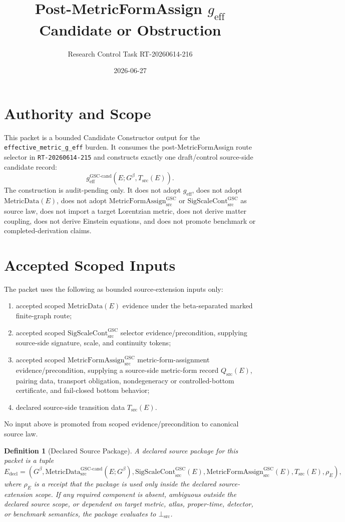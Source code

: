 \documentclass[11pt]{article}
\title{Post-MetricFormAssign \texorpdfstring{$g_{\mathrm{eff}}$}{g_eff} Candidate or Obstruction}
\author{Research Control Task RT-20260614-216}
\date{2026-06-27}
\newtheorem{definition}{Definition}
\newcommand{\Gbeta}{G^{\beta}}
\newcommand{\MetricDataCand}{\mathrm{MetricData}^{\mathrm{GSC\mbox{-}cand}}_{\mathrm{src}}}
\newcommand{\SigScaleCont}{\mathrm{SigScaleCont}^{\mathrm{GSC}}_{\mathrm{src}}}
\newcommand{\MetricFormAssign}{\mathrm{MetricFormAssign}^{\mathrm{GSC}}_{\mathrm{src}}}
\newcommand{\Qsrc}{Q_{\mathrm{src}}}
\newcommand{\Tsrc}{T_{\mathrm{src}}}
\newcommand{\BottomSrc}{\bot_{\mathrm{src}}}
\newcommand{\geff}{g_{\mathrm{eff}}}
\newcommand{\geffCand}{g_{\mathrm{eff}}^{\mathrm{GSC\mbox{-}cand}}}
\begin{document}
\maketitle

\section*{Authority and Scope}

This packet is a bounded Candidate Constructor output for the
\texttt{effective\_metric\_g\_eff} burden. It consumes the
post-MetricFormAssign route selector in
\texttt{RT-20260614-215} and constructs exactly one draft/control source-side
candidate record:
\[
  \geffCand(E;\Gbeta,\Tsrc(E)).
\]
The construction is audit-pending only. It does not adopt \(\geff\), does not
adopt \(\mathrm{MetricData}(E)\), does not adopt \(\MetricFormAssign\) or
\(\SigScaleCont\) as source law, does not import a target Lorentzian metric,
does not derive matter coupling, does not derive Einstein equations, and does
not promote benchmark or completed-derivation claims.

\section*{Accepted Scoped Inputs}

The packet uses the following as bounded source-extension inputs only:

\begin{enumerate}[label=\textbf{I\arabic*.}]
  \item accepted scoped \(\mathrm{MetricData}(E)\) evidence under the
  beta-separated marked finite-graph route;
  \item accepted scoped \(\SigScaleCont\) selector evidence/precondition,
  supplying source-side signature, scale, and continuity tokens;
  \item accepted scoped \(\MetricFormAssign\) metric-form-assignment
  evidence/precondition, supplying a source-side metric-form record
  \(\Qsrc(E)\), pairing data, transport obligation, nondegeneracy or
  controlled-bottom certificate, and fail-closed bottom behavior;
  \item declared source-side transition data \(\Tsrc(E)\).
\end{enumerate}

No input above is promoted from scoped evidence/precondition to canonical
source law.

\begin{definition}[Declared Source Package]
A declared source package for this packet is a tuple
\[
E_{\mathrm{decl}} =
(\Gbeta,\MetricDataCand(E;\Gbeta),\SigScaleCont(E),\MetricFormAssign(E),
\Tsrc(E),\rho_E),
\]
where \(\rho_E\) is a receipt that the package is used only inside the declared
source-extension scope. If any required component is absent, ambiguous outside
the declared source scope, or dependent on target metric, atlas, proper-time,
detector, or benchmark semantics, the package evaluates to \(\BottomSrc\).
\end{definition}
\end{document}
